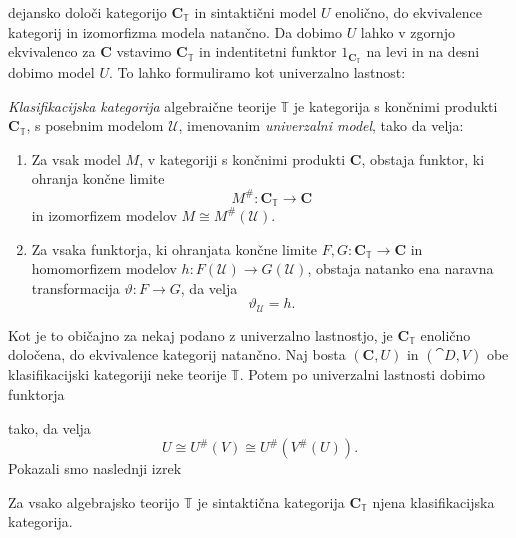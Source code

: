 \documentclass[../kategoricna_logika.tex]{subfiles}
\begin{document}
dejansko določi kategorijo $\mathbf{C}_{\mathbb{T}}$ in sintaktični model $U$ enolično,
do ekvivalence kategorij in izomorfizma modela natančno.
Da dobimo $U$ lahko v zgornjo ekvivalenco za $\mathbf{C}$ vstavimo $\mathbf{C}_{\mathbb{T}}$
in indentitetni funktor $1_{\mathbf{C}_{\mathbb{T}}}$ na levi in na desni dobimo
model $U$. To lahko formuliramo kot univerzalno lastnost:
\begin{definicija}
  \emph{Klasifikacijska kategorija} algebraične teorije $\mathbb{T}$
  je kategorija s končnimi produkti $\mathbf{C}_\mathbb{T}$, s
  posebnim modelom $\mathcal{U}$, imenovanim \emph{univerzalni model},
  tako da velja:
  \begin{enumerate}
  \item Za vsak model $M$, v kategoriji s končnimi produkti
    $\mathbf{C}$, obstaja funktor, ki ohranja končne limite
    $$M^{\#} : \mathbf{C}_\mathbb{T} \to \mathbf{C}$$ in izomorfizem
    modelov $M \cong M^{\#}(\mathcal{U})$.
%
  \item Za vsaka funktorja, ki ohranjata končne limite
    $F,G : \mathbf{C}_\mathbb{T} \to \mathbf{C}$ in homomorfizem
    modelov $h: F(\mathcal{U}) \to G(\mathcal{U})$, obstaja natanko
    ena naravna transformacija $\vartheta : F \to G$, da velja
$$\vartheta_\mathcal{U} = h.$$
\end{enumerate}
\end{definicija}
Kot je to običajno za nekaj podano z univerzalno lastnostjo,
je $\mathbf{C}_\mathbb{T}$ enolično določena, do ekvivalence kategorij natančno.
%
Naj bosta $(\mathbf{C}, U)$ in $(\cat{D}, V)$ obe klasifikacijski
kategoriji neke teorije $\mathbb{T}$. Potem po univerzalni lastnosti
dobimo funktorja
\begin{center}
\end{center}
tako, da velja
$$U \cong U^{\#}(V) \cong U^{\#}(V^{\#}(U)).$$
Pokazali smo naslednji izrek
\begin{izrek}
\label{sec:klasifikacijska-kategorija-alg-teorije}
Za vsako algebrajsko teorijo $\mathbb{T}$ je sintaktična kategorija $\mathbf{C}_{\mathbb{T}}$
njena klasifikacijska kategorija.
\end{izrek}
\end{document}
